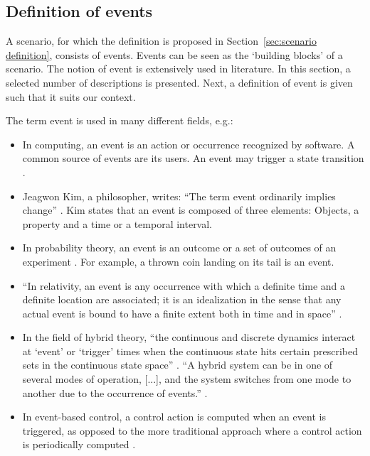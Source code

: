\subsection{Definition of events}
\label{sec:events}
A scenario, for which the definition is proposed in Section~\ref{sec:scenario definition}, consists of events. Events can be seen as the `building blocks' of a scenario. The notion of event is extensively used in literature. In this section, a selected number of descriptions is presented. Next, a definition of event is given such that it suits our context.

The term event is used in many different fields, e.g.:
\begin{itemize}
	\item In computing, an event is an action or occurrence recognized by software. A common source of events are its users. An event may trigger a state transition \cite{breu1997towards}.
	\item Jeagwon Kim, a philosopher, writes: ``The term event ordinarily implies change'' \cite{kim1993supervenience}. Kim states that an event is composed of three elements: Objects, a property and a time or a temporal interval. 
	\item In probability theory, an event is an outcome or a set of outcomes of an experiment \cite{pfeiffer2013concepts}. For example, a thrown coin landing on its tail is an event.
	\item ``In relativity, an event is any occurrence with which a definite time and a definite location are associated; it is an idealization in the sense that any actual event is bound to have a finite extent both in time and in space'' \cite{sartori1996understanding}.
	\item In the field of hybrid theory, ``the continuous and discrete dynamics interact at `event' or `trigger' times when the continuous state hits certain prescribed sets in the continuous state space'' \cite{branicky1998hybridcontrol}. ``A hybrid system can be in one of several modes of operation, [...], and the system switches from one mode to another due to the occurrence of events.'' \cite{boel1999hybridcontrol}.
	\item In event-based control, a control action is computed when an event is triggered, as opposed to the more traditional approach where a control action is periodically computed \cite{heemels2012eventcontrol}. 
\end{itemize}

